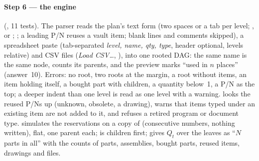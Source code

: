 \paragraph{Step 6 --- the engine} (, 11 tests). The parser reads the plan's
text form (two spaces or a tab per level; ,  or ; ; a leading P/N reuses a
vault item; blank lines and \code{\#} comments skipped), a spreadsheet paste (tab-separated \emph{level, name,
qty, type}, header optional, levels relative) and CSV files (\emph{Load CSV\ldots}, ),
into one rooted DAG: the same name is the same node,  counts its parents, and the preview marks ``used in
$n$ places'' (answer~10). Errors: no root, two roots at the margin, a root without items, an item holding itself,
a bought part with children, a quantity below~1, a P/N as the top; a deeper indent than one level is read as one
level with a warning.  looks the reused P/Ns up (unknown, obsolete, a drawing), warns that items typed
under an existing item are not added to it, and refuses a retired program or document type. 
simulates the reservations on a copy of  (consecutive numbers, nothing written), flat, one
parent each;  is children first;  gives $Q_t$ over the leaves as ``$N$ parts in
all'' with the counts of parts, assemblies, bought parts, reused items, drawings and files.

